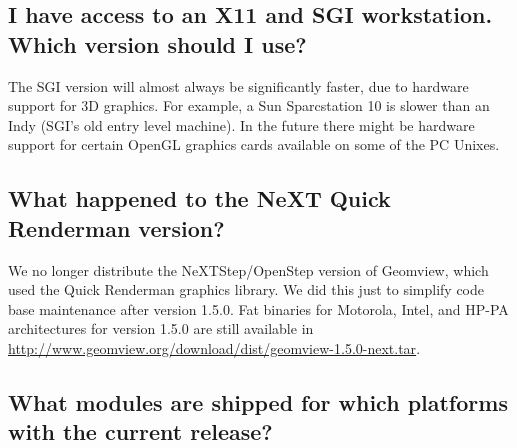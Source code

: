 \documentclass[12pt,a4paper]{article}
\begin{document}
    \subsection{I have access to an X11 and SGI workstation. Which version should I use?}

        The SGI version will almost always be significantly faster, due to
        hardware support for 3D graphics. For example, a Sun Sparcstation 10 is
        slower than an Indy (SGI's old entry level machine). In the future there
        might be hardware support for certain OpenGL graphics cards available on
        some of the PC Unixes.

    \subsection{What happened to the NeXT Quick Renderman version?}

        We no longer distribute the NeXTStep/OpenStep version of Geomview, which
        used the Quick Renderman graphics library. We did this just to simplify
        code base maintenance after version 1.5.0. Fat binaries for Motorola,
        Intel, and HP-PA architectures for version 1.5.0 are still available in\\
        \url{http://www.geomview.org/download/dist/geomview-1.5.0-next.tar}.

    \subsection{What modules are shipped for which platforms with the current release?}
\end{document}
